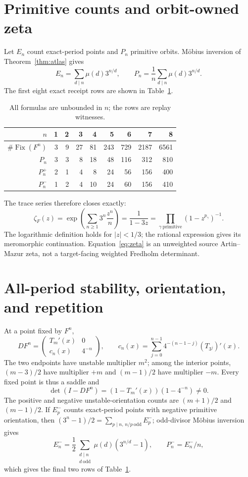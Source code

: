 \documentclass[10pt]{article}
\newcommand{\Fix}{\operatorname{Fix}}
\begin{document}
\section{Primitive counts and orbit-owned zeta}
Let $E_n$ count exact-period points and $P_n$ primitive orbits.  M\"obius
inversion of Theorem~\ref{thm:atlas} gives
\begin{equation}\label{eq:primitive}
 E_n=\sum_{d\mid n}\mu(d)3^{n/d},\qquad
 P_n=\frac1n\sum_{d\mid n}\mu(d)3^{n/d}.
\end{equation}
The first eight exact receipt rows are shown in Table~\ref{tab:counts}.
\begin{table}[ht]
\centering
\small
\caption{All formulas are unbounded in $n$; the rows are replay witnesses.}
\label{tab:counts}
\begin{tabular}{@{}rrrrrrrrr@{}}
\toprule
$n$&1&2&3&4&5&6&7&8\\
\midrule
$\#\Fix(F^n)$&3&9&27&81&243&729&2187&6561\\
$P_n$&3&3&8&18&48&116&312&810\\
$P_n^+$&2&1&4&8&24&56&156&400\\
$P_n^-$&1&2&4&10&24&60&156&410\\
\bottomrule
\end{tabular}
\end{table}
The trace series therefore closes exactly:
\begin{equation}\label{eq:zeta}
 \zeta_F(z)=\exp\left(\sum_{n\ge1}3^n\frac{z^n}{n}\right)
 =\frac1{1-3z}
 =\prod_{\gamma\ \mathrm{primitive}}(1-z^{p_\gamma})^{-1}.
\end{equation}
The logarithmic definition holds for $|z|<1/3$; the rational expression gives
its meromorphic continuation.  Equation~\eqref{eq:zeta} is an unweighted
source Artin--Mazur zeta, not a target-facing weighted Fredholm determinant.

\section{All-period stability, orientation, and repetition}
At a point fixed by $F^n$,
\begin{equation}\label{eq:jacobian}
 DF^n=\begin{pmatrix}T_m'(x)&0\\c_n(x)&4^{-n}\end{pmatrix},\qquad
 c_n(x)=\sum_{j=0}^{n-1}4^{-(n-1-j)}(T_{3^j})'(x).
\end{equation}
The two endpoints have unstable multiplier $m^2$; among the interior points,
$(m-3)/2$ have multiplier $+m$ and $(m-1)/2$ have multiplier $-m$.
Every fixed point is thus a saddle and
\begin{equation}\label{eq:stability}
 \det(I-DF^n)=(1-T_m'(x))(1-4^{-n})\ne0.
\end{equation}
The positive and negative unstable-orientation counts are $(m+1)/2$ and
$(m-1)/2$.  If $E_p^-$ counts exact-period points with negative primitive
orientation, then $(3^n-1)/2=\sum_{p\mid n,\,n/p\ \mathrm{odd}}E_p^-$;
odd-divisor M\"obius inversion gives
\[
 E_n^-=\frac12\sum_{\substack{d\mid n\\d\ \mathrm{odd}}}
 \mu(d)(3^{n/d}-1),\qquad P_n^-=E_n^-/n,
\]
which gives the final two rows of Table~\ref{tab:counts}.
\end{document}
